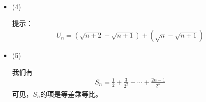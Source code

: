 \documentclass{article}
\begin{document}
\begin{itemize}
        我们有
        \begin{align*}
          \frac{1}{n (n + 1)(n + 2)}
           & = \frac{1}{n}\left(\frac{1}{(n + 1)(n + 2)}\right)                                               \\
           & = \frac{1}{n} \left( \frac{1}{n+1} - \frac{1}{n+2} \right)                                       \\
           & = \frac{1}{n(n+1)} - \frac{1}{n(n+2)}                                                            \\
           & = \left(\frac{1}{n} - \frac{1}{n+1}\right) - \frac{1}{2}\left(\frac{1}{n} - \frac{1}{n+2}\right)
        \end{align*}
        于是，我们有
        \begin{align*}
          S_n & = \left[\left(1 - \frac{1}{2}\right) + \cdots + \left(\frac{1}{n} - \frac{1}{n+1}\right)\right]                                                                                             \\
              & -\frac{1}{2}\left[\left(1 - \frac{1}{3}\right) + \left(\frac{1}{2} - \frac{1}{4}\right) + \left(\frac{1}{3} - \frac{1}{5}\right) + \cdots + \left(\frac{1}{n} - \frac{1}{n+2}\right)\right] \\
              & = 1 - \frac{1}{n+1} -\frac{1}{2}\left[\left(1 + \frac{1}{2} - \frac{1}{n+2}\right) \right]
        \end{align*}
        所以
        \begin{align*}
          \lim\limits_{n \to \infty} S_n & = 1 - \frac{1}{n+1} -\frac{1}{2}\left[\left(1 + \frac{1}{2} - \frac{1}{n+2}\right) \right] \\
                                         & = \frac{1}{4}
        \end{align*}

  \item (4)

        提示：
        \begin{align*}
          U_n = (\sqrt{n+2} - \sqrt{n+1}) + (\sqrt{n} - \sqrt{n+1})
        \end{align*}


  \item (5)

        我们有
        \begin{align*}
          S_n = \frac{1}{2} + \frac{3}{2^2} + \cdots + \frac{2n - 1}{2^n}
        \end{align*}
        可见，$S_n$的项是等差乘等比。


\end{itemize}
\end{document}
